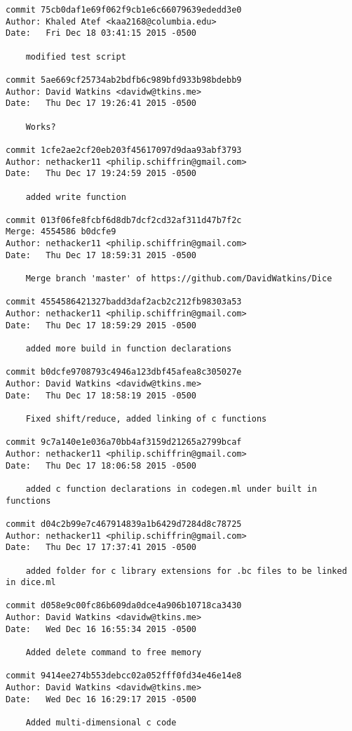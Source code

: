 \begin{verbatim}
commit 75cb0daf1e69f062f9cb1e6c66079639ededd3e0
Author: Khaled Atef <kaa2168@columbia.edu>
Date:   Fri Dec 18 03:41:15 2015 -0500

    modified test script

commit 5ae669cf25734ab2bdfb6c989bfd933b98bdebb9
Author: David Watkins <davidw@tkins.me>
Date:   Thu Dec 17 19:26:41 2015 -0500

    Works?

commit 1cfe2ae2cf20eb203f45617097d9daa93abf3793
Author: nethacker11 <philip.schiffrin@gmail.com>
Date:   Thu Dec 17 19:24:59 2015 -0500

    added write function

commit 013f06fe8fcbf6d8db7dcf2cd32af311d47b7f2c
Merge: 4554586 b0dcfe9
Author: nethacker11 <philip.schiffrin@gmail.com>
Date:   Thu Dec 17 18:59:31 2015 -0500

    Merge branch 'master' of https://github.com/DavidWatkins/Dice

commit 4554586421327badd3daf2acb2c212fb98303a53
Author: nethacker11 <philip.schiffrin@gmail.com>
Date:   Thu Dec 17 18:59:29 2015 -0500

    added more build in function declarations

commit b0dcfe9708793c4946a123dbf45afea8c305027e
Author: David Watkins <davidw@tkins.me>
Date:   Thu Dec 17 18:58:19 2015 -0500

    Fixed shift/reduce, added linking of c functions

commit 9c7a140e1e036a70bb4af3159d21265a2799bcaf
Author: nethacker11 <philip.schiffrin@gmail.com>
Date:   Thu Dec 17 18:06:58 2015 -0500

    added c function declarations in codegen.ml under built in functions

commit d04c2b99e7c467914839a1b6429d7284d8c78725
Author: nethacker11 <philip.schiffrin@gmail.com>
Date:   Thu Dec 17 17:37:41 2015 -0500

    added folder for c library extensions for .bc files to be linked in dice.ml

commit d058e9c00fc86b609da0dce4a906b10718ca3430
Author: David Watkins <davidw@tkins.me>
Date:   Wed Dec 16 16:55:34 2015 -0500

    Added delete command to free memory

commit 9414ee274b553debcc02a052fff0fd34e46e14e8
Author: David Watkins <davidw@tkins.me>
Date:   Wed Dec 16 16:29:17 2015 -0500

    Added multi-dimensional c code


\end{verbatim}
